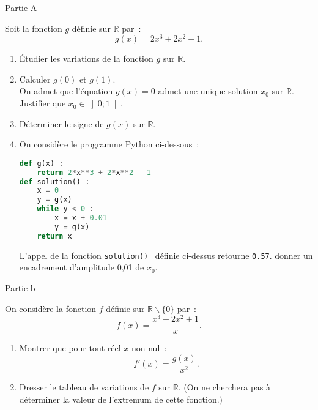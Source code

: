 
\begin{center}
     \begin{h3} Partie A \end{h3}
\end{center}
Soit la fonction $ g $ définie sur $  \mathbb{R}  $ par~:
\[
g (x) =2x^{ 3 } +2x^2  - 1.
\]
\begin{enumerate}
     \item
     Étudier les variations de la fonction $ g $ sur $  \mathbb{R} . $
     \item
     Calculer $ g (0)  $ et $ g (1).  $\\
     On admet que l'équation $ g (x) =0 $ admet une unique solution  $ x_{ 0 }  $ sur $  \mathbb{R}$.  \\
     Justifier que $ x_{ 0 }  \in  \left] 0 ; 1 \right[$.
     \item
     Déterminer le signe de $ g (x)  $ sur $  \mathbb{R}$.
     \item
     On considère le programme Python ci-dessous~:
\begin{lstlisting}[language=Python]
def g(x) :
    return 2*x**3 + 2*x**2 - 1
def solution() :
    x = 0
    y = g(x)
    while y < 0 :
        x = x + 0.01
        y = g(x)
    return x
\end{lstlisting}
L'appel de la fonction \texttt{solution() } définie ci-dessus retourne \texttt{0.57}.
\newpar
donner un encadrement d'amplitude 0,01 de  $ x_{ 0 }. $
\end{enumerate}
\begin{center}
     \begin{h3} Partie b \end{h3}
\end{center}
On considère la fonction $ f $ définie sur  $  \mathbb{R}  \backslash  \{ 0 \}  $ par~: \\
\[
f (x) = \frac{ x^{ 3 } +2x^2 +1 }{ x } .
\]
\begin{enumerate}
     \item
     Montrer que pour tout réel $ x $ non nul~:
     \[
     f'  (x)= \frac{ g (x)  }{ x^2  } .
     \]
     \item
     Dresser le tableau de variations de $ f $ sur $  \mathbb{R} . $  (On ne cherchera pas à déterminer la valeur de l’extremum de cette fonction.)
\end{enumerate}
%
